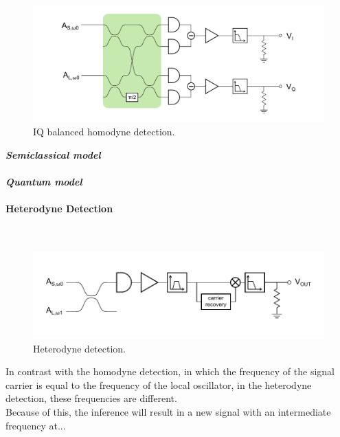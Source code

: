 \begin{figure}[H]
	\centering
	\includegraphics[width=15cm]{./sdf/optical_detection/figures/detection-IQ-balanced-homodyne.pdf}
	\caption{IQ balanced homodyne detection.}
\end{figure}
\noindent
{\bf \em Semiclassical model}\\
\\
{\bf \em Quantum model}\\


\paragraph{Heterodyne Detection}\ \\
\begin{figure}[H]
	\centering
	\includegraphics{./sdf/optical_detection/figures/detection-heterodyne.pdf}
	\caption{Heterodyne detection.}
\end{figure}

In contrast with the homodyne detection, in which the frequency of the signal carrier is equal to the frequency of the local oscillator, in the heterodyne detection, these frequencies are different.\\
Because of this, the inference will result in a new signal with an intermediate frequency at...\\
\\



